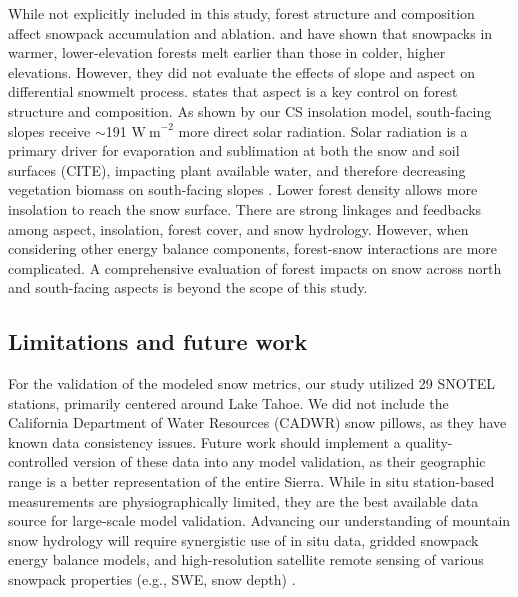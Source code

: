 While not explicitly included in this study, forest structure and composition affect snowpack accumulation and ablation. \cite{rothForestImpactsSnow2017} and \cite{lundquistLowerForestDensity2013} have shown that snowpacks in warmer, lower-elevation forests melt earlier than those in colder, higher elevations. However, they did not evaluate the effects of slope and aspect on differential snowmelt process. \cite{pelletierWhichWayYou2018a} states that aspect is a key control on forest structure and composition. As shown by our CS insolation model, south-facing slopes receive $\sim$191 $\mathrm{W~m}^{-2}$ more direct solar radiation. Solar radiation is a primary driver for evaporation and sublimation at both the snow and soil surfaces (CITE), impacting plant available water, and therefore decreasing vegetation biomass on south-facing slopes \citep{zapata-riosInfluenceTerrainAspect2016}. Lower forest density allows more insolation to reach the snow surface. There are strong linkages and feedbacks among aspect, insolation, forest cover, and snow hydrology. However, when considering other energy balance components, forest-snow interactions are more complicated.  A comprehensive evaluation of forest impacts on snow across north and south-facing aspects is beyond the scope of this study.

\hypertarget{ch2-discussion-1}{\subsection{Limitations and future work}\label{ch2-discussion-1}}

For the validation of the modeled snow metrics, our study utilized 29 SNOTEL stations, primarily centered around Lake Tahoe. We did not include the California Department of Water Resources (CADWR) snow pillows, as they have known data consistency issues. Future work should implement a quality-controlled version of these data into any model validation, as their geographic range is a better representation of the entire Sierra. While in situ station-based measurements are physiographically limited, they are the best available data source for large-scale model validation. Advancing our understanding of mountain snow hydrology will require synergistic use of in situ data, gridded snowpack energy balance models, and high-resolution satellite remote sensing of various snowpack properties (e.g., SWE, snow depth) \citep{flemingSNOTELSoilClimate2023}.

